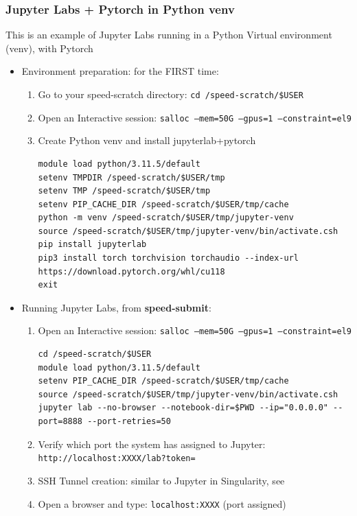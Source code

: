 \subsubsection{Jupyter Labs + Pytorch in Python venv}
\label{sect:jupiterlabs-venv}

This is an example of Jupyter Labs running in a Python Virtual environment (venv), with Pytorch

\begin{itemize}
\item
Environment preparation: for the FIRST time:
\begin{enumerate}
\item
Go to your speed-scratch directory: \texttt{cd /speed-scratch/\$USER}
\item
Open an Interactive session: \texttt{salloc --mem=50G --gpus=1 --constraint=el9}
\item
Create Python venv and install jupyterlab+pytorch
\scriptsize
\begin{verbatim}
module load python/3.11.5/default
setenv TMPDIR /speed-scratch/$USER/tmp
setenv TMP /speed-scratch/$USER/tmp
setenv PIP_CACHE_DIR /speed-scratch/$USER/tmp/cache
python -m venv /speed-scratch/$USER/tmp/jupyter-venv
source /speed-scratch/$USER/tmp/jupyter-venv/bin/activate.csh
pip install jupyterlab
pip3 install torch torchvision torchaudio --index-url https://download.pytorch.org/whl/cu118
exit
\end{verbatim}
\normalsize
\end{enumerate}
\item
Running Jupyter Labs, from \textbf{speed-submit}:
\begin{enumerate}
\item
Open an Interactive session: \texttt{salloc --mem=50G --gpus=1 --constraint=el9} 
\scriptsize
\begin{verbatim}
cd /speed-scratch/$USER
module load python/3.11.5/default
setenv PIP_CACHE_DIR /speed-scratch/$USER/tmp/cache
source /speed-scratch/$USER/tmp/jupyter-venv/bin/activate.csh
jupyter lab --no-browser --notebook-dir=$PWD --ip="0.0.0.0" --port=8888 --port-retries=50
\end{verbatim}
\normalsize
\item
Verify which port the system has assigned to Jupyter: 
\texttt{http://localhost:XXXX/lab?token=}
\item
SSH Tunnel creation: similar to Jupyter in Singularity, see 
\item
Open a browser and type: \texttt {localhost:XXXX} (port assigned)
\end{enumerate}
\end{itemize}


